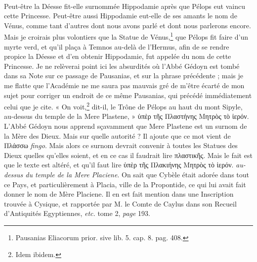 \documentclass[a4paper, 11pt, oneside, polutonikogreek, french]{article}
\begin{document}
\paragraph{}
Peut-être la Déesse fit-elle surnommée Hippodamie après que Pélops eut vaincu cette Princesse. Peut-être aussi Hippodamie eut-elle de ses amants le nom de Vénus, comme tant d'autres dont nous avons parlé et dont nous parlerons encore. Mais je croirais plus volontiers que la Statue de Vénus,\footnote{Pausanias Eliacorum prior. sive lib. 5. cap. 8. pag. 408.} que Pélops fit faire d'un myrte verd, et qu'il plaça à Temnos au-delà de l'Hermus, afin de se rendre propice la Déesse et d'en obtenir Hippodamie, fut appelée du nom de cette Princesse. Je ne relèverai point ici les absurdités où l'Abbé Gédoyn est tombé dans sa Note sur ce passage de Pausanias, et sur la phrase précédente ; mais je me flatte que l'Académie ne me saura pas mauvais gré de m'être écarté de mon sujet pour corriger un endroit de ce même Pausanias, qui précédé immédiatement celui que je cite. « On voit,\footnote{Idem ibidem.} dit-il, le Trône de Pélops au haut du mont Sipyle, au-dessus du temple de la Mere Plastene, » ὑπὲρ τῆς Πλαστήνης Μητρὸς τὸ ἱερόν. L'Abbé Gédoyn nous apprend sçavamment que Mere Plastene est un surnom de la Mère des Dieux. Mais sur quelle autorité ? Il ajoute que ce mot vient de Πλάσσω \emph{fingo}. Mais alors ce surnom devrait convenir à toutes les Statues des Dieux quelles qu'elles soient, et en ce cas il faudrait lire πλαστικῆς. Mais le fait est que le texte est altéré, et qu'il faut lire ὑπὲρ τῆς Πλακιήνης Μητρὸς τὸ ἱερόν. \emph{au-dessus du temple de la Mere Placiene}. On sait que Cybèle était adorée dans tout ce Pays, et particulièrement à Placia, ville de la Propontide, ce qui lui avait fait donner le nom de Mère Placiene. Il en est fait mention dans une Inscription trouvée à Cysique, et rapportée par M. le Comte de Caylus dans son Recueil d'Antiquités Egyptiennes, \emph{etc.} tome 2, \emph{page} 193.
\end{document}
